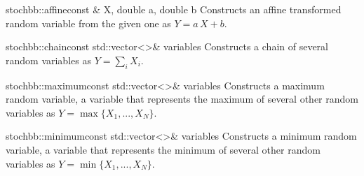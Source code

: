 \begin{deffunc}{stochbb::affine}{}{const \& X, double a, double b}
Constructs an affine transformed random variable from the given one as $Y = a\,X+b$.
\end{deffunc}

\begin{deffunc}{stochbb::chain}{}{const std::vector<>\& variables}
Constructs a chain of several random variables as $Y = \sum_i X_i$. 
\end{deffunc}

\begin{deffunc}{stochbb::maximum}{}{const std::vector<>\& variables}
Constructs a maximum random variable, a variable that represents the maximum of several other random variables as $Y = \max\{X_1,...,X_N\}$.
\end{deffunc}

\begin{deffunc}{stochbb::minimum}{}{const std::vector<>\& variables}
Constructs a minimum random variable, a variable that represents the minimum of several other random variables as $Y = \min\{X_1,...,X_N\}$.
\end{deffunc}


